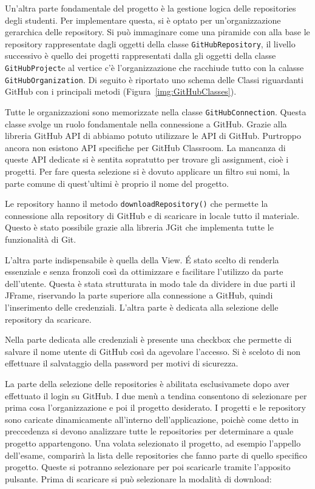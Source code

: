 		Un'altra parte fondamentale del progetto è la gestione logica delle repositories degli studenti.
		Per implementare questa, si è optato per un'organizzazione gerarchica delle repository.
		Si può immaginare come una piramide con alla base le repository rappresentate dagli oggetti della classe \verb|GitHubRepository|, il livello successivo è quello dei progetti rappresentati dalla gli oggetti della classe \verb|GitHubProject|e al vertice c'è l'organizzazione che racchiude tutto con la calasse \verb|GitHubOrganization|.
		Di seguito è riportato uno schema delle Classi riguardanti GitHub con i principali metodi (Figura~\ref{img:GitHubClasses}).
		
		\begin{center}
			\label{img:GitHubClasses}
		\end{center}
		
		
		Tutte le organizzazioni sono memorizzate nella classe \verb|GitHubConnection|.
		Questa classe svolge un ruolo fondamentale nella connessione a GitHub. Grazie alla libreria GitHub API di \citep{GitHubAPI} abbiamo potuto utilizzare le API di GitHub.
		Purtroppo ancora non esistono API specifiche per GitHub Classroom. La mancanza di queste API dedicate si è sentita sopratutto per trovare gli assignment, cioè i progetti. Per fare questa selezione si è dovuto applicare un filtro sui nomi, la parte comune di quest'ultimi è proprio il nome del progetto.
		
		Le repository hanno il metodo \verb|downloadRepository()| che permette la connessione alla repository di GitHub e di scaricare in locale tutto il materiale. Questo è stato possibile grazie alla libreria JGit che implementa tutte le funzionalità di Git.
		
		L'altra parte indispensabile è quella della View.
		\'E stato scelto di renderla essenziale e senza fronzoli così da ottimizzare e facilitare l'utilizzo da parte dell'utente.
		Questa è stata strutturata in modo tale da dividere in due parti il JFrame, riservando la parte superiore alla connessione a GitHub, quindi l'inserimento delle credenziali. L'altra parte è dedicata alla selezione delle repository da scaricare.
		
		Nella parte dedicata alle credenziali è presente una checkbox che permette di salvare il nome utente di GitHub così da agevolare l'accesso. Si è sceloto di non effettuare il salvataggio della password per motivi di sicurezza.
		
		La parte della selezione delle repositories è abilitata esclusivamete dopo aver effettuato il login su GitHub. I due menù a tendina consentono di selezionare per prima cosa l'organizzazione e poi il progetto desiderato.
		I progetti e le repository sono caricate dinamicamente all'interno dell'applicazione, poichè come detto in preccedenza si devono analizzare tutte le repositories per determinare a quale progetto appartengono.
		Una volata selezionato il progetto, ad esempio l'appello dell'esame, comparirà la lista delle repositories che fanno parte di quello specifico progetto. Queste si potranno selezionare per poi scaricarle tramite l'apposito pulsante.
		Prima di scaricare si può selezionare la modalità di download:
		
